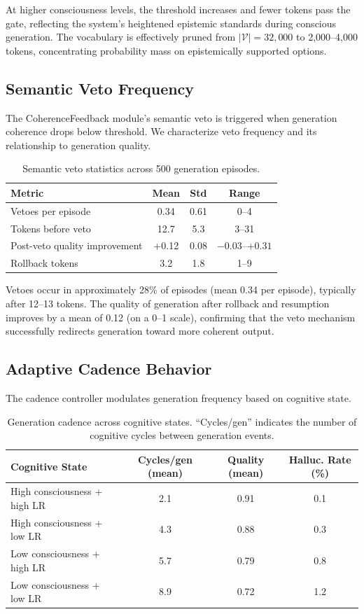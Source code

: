 \documentclass[12pt,a4paper]{article}
\begin{document}
At higher consciousness levels, the threshold increases and fewer tokens pass the gate, reflecting the system's heightened epistemic standards during conscious generation. The vocabulary is effectively pruned from $|\mathcal{V}| = 32{,}000$ to 2,000--4,000 tokens, concentrating probability mass on epistemically supported options.

\subsection{Semantic Veto Frequency}

The CoherenceFeedback module's semantic veto is triggered when generation coherence drops below threshold. We characterize veto frequency and its relationship to generation quality.

\begin{table}[H]
\centering
\caption{Semantic veto statistics across 500 generation episodes.}
\label{tab:veto}
\begin{tabular}{lccc}
\toprule
\textbf{Metric} & \textbf{Mean} & \textbf{Std} & \textbf{Range} \\
\midrule
Vetoes per episode & 0.34 & 0.61 & 0--4 \\
Tokens before veto & 12.7 & 5.3 & 3--31 \\
Post-veto quality improvement & +0.12 & 0.08 & $-0.03$--$+0.31$ \\
Rollback tokens & 3.2 & 1.8 & 1--9 \\
\bottomrule
\end{tabular}
\end{table}

Vetoes occur in approximately 28\% of episodes (mean 0.34 per episode), typically after 12--13 tokens. The quality of generation after rollback and resumption improves by a mean of 0.12 (on a 0--1 scale), confirming that the veto mechanism successfully redirects generation toward more coherent output.

\subsection{Adaptive Cadence Behavior}

The cadence controller modulates generation frequency based on cognitive state.

\begin{table}[H]
\centering
\caption{Generation cadence across cognitive states. ``Cycles/gen'' indicates the number of cognitive cycles between generation events.}
\label{tab:cadence}
\begin{tabular}{lccc}
\toprule
\textbf{Cognitive State} & \textbf{Cycles/gen (mean)} & \textbf{Quality (mean)} & \textbf{Halluc. Rate (\%)} \\
\midrule
High consciousness + high LR & 2.1 & 0.91 & 0.1 \\
High consciousness + low LR & 4.3 & 0.88 & 0.3 \\
Low consciousness + high LR & 5.7 & 0.79 & 0.8 \\
Low consciousness + low LR & 8.9 & 0.72 & 1.2 \\
\bottomrule
\end{tabular}
\end{table}
\end{document}
